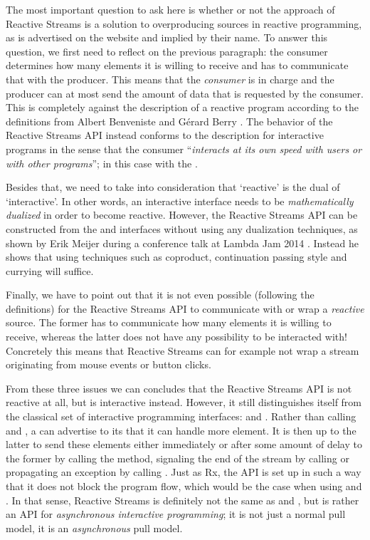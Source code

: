 The most important question to ask here is whether or not the approach of Reactive Streams is a solution to overproducing sources in reactive programming, as is advertised on the website \cite{Reactive-Streams} and implied by their name. To answer this question, we first need to reflect on the previous paragraph: the consumer determines how many elements it is willing to receive and has to communicate that with the producer. This means that the \emph{consumer} is in charge and the producer can at most send the amount of data that is requested by the consumer. This is completely against the description of a reactive program according to the definitions from Albert Benveniste and G\'erard Berry \cite{berry1991-Reactive}. The behavior of the Reactive Streams API instead conforms to the description for interactive programs in the sense that the consumer ``\textit{interacts at its own speed with users or with other programs}''; in this case with the .

Besides that, we need to take into consideration that `reactive' is the dual of `interactive'. In other words, an interactive interface needs to be \emph{mathematically dualized} in order to become reactive. However, the Reactive Streams API can be constructed from the \ieb and \ier interfaces without using any dualization techniques, as shown by Erik Meijer during a conference talk at Lambda Jam 2014 \cite{meijer2014-Derivation}. Instead he shows that using techniques such as coproduct, continuation passing style and currying will suffice.

Finally, we have to point out that it is not even possible (following the definitions) for the Reactive Streams API to communicate with or wrap a \emph{reactive} source. The former has to communicate how many elements it is willing to receive, whereas the latter does not have any possibility to be interacted with! Concretely this means that Reactive Streams can for example not wrap a stream originating from mouse events or button clicks.

From these three issues we can concludes that the Reactive Streams API is not reactive at all, but is interactive instead. However, it still distinguishes itself from the classical set of interactive programming interfaces: \ieb and \ier. Rather than calling  and , a  can advertise to its  that it can handle  more element. It is then up to the latter to send these elements either immediately or after some amount of delay to the former by calling the  method, signaling the end of the stream by calling  or propagating an exception by calling . Just as Rx, the API is set up in such a way that it does not block the program flow, which would be the case when using \ieb and \ier. In that sense, Reactive Streams is definitely not the same as \ieb and \ier, but is rather an API for \textit{asynchronous interactive programming}; it is not just a normal pull model, it is an \textit{asynchronous} pull model.

